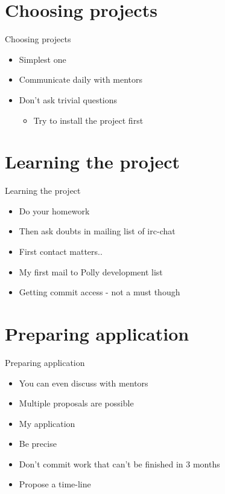 \documentclass{beamer}
\begin{document}
\section{Choosing projects}
\begin{frame}{Choosing projects}
\begin{itemize}
\begin{block}
{Starting to contribute to a project earlier is the natural way to enter GSOC.
In that sense this is a long term commitment}
\end{block}
\item Simplest one
\item Communicate daily with mentors
\item Don't ask trivial questions
  \begin{itemize}
  \item Try to install the project first
  \end{itemize}
\end{itemize}
\end{frame}

\section{Learning the project}
\begin{frame}{Learning the project}
\begin{itemize}
\item Do your homework
\item Then ask doubts in mailing list of irc-chat
\item First contact matters..
\item My first mail to Polly development list
\item Getting commit access - not a must though
\end{itemize}
\end{frame}

\section{Preparing application}
\begin{frame}{Preparing application}
\begin{itemize}
\item You can even discuss with mentors
\item Multiple proposals are possible
\item My application
\item Be precise
\item Don't commit work that can't be finished in 3 months
\item Propose a time-line
\end{itemize}
\end{frame}
\end{document}
